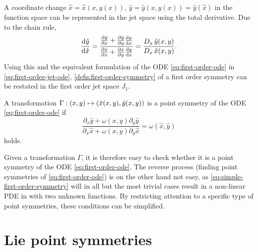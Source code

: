 A coordinate change \(\hat{x} = \hat{x}(x, y(x)),\, \hat{y} = \hat{y}(x, y(x)) = \hat{y}(\hat{x})\) in the function space can be represented in the jet space using the total derivative.
Due to the chain rule,
\begin{equation}
  \dv{\hat{y}}{\hat{x}} = 
  \frac{\pdv{\hat{y}}{x} + \pdv{\hat{y}}{y} \dv{y}{x}}{\pdv{\hat{x}}{x} + \pdv{\hat{x}}{y} \dv{y}{x}} =
  \frac{D_{x}\, \hat{y}(x,y)}{D_{x}\, \hat{x}(x,y)}.
\end{equation}
Using this and the equivalent formulation of the ODE \ref{eq:first-order-ode} in \cref{eq:first-order-jet-ode}, \cref{defn:first-order-symmetry} of a first order symmetry can be restated in the first order jet space \(J_1\).
\begin{lem} \label{lem:simple-first-order-symmetry}
  A transformation \(\Gamma: \pqty{x,y} \mapsto \pqty{\hat{x}(x,y), \hat{y}(x,y)}\) is a point symmetry of the ODE \ref{eq:first-order-ode} if
  \begin{equation} \label{eq:simple-first-order-symmetry}
    \frac{\partial_x \hat{y} + \omega(x,y) \partial_y \hat{y}}{\partial_x \hat{x} + \omega(x,y) \partial_y \hat{x}} = \omega(\hat{x},\hat{y})
  \end{equation}
  holds.
\end{lem} %
Given a transformation \(\Gamma\), it is therefore easy to check whether it is a point symmetry of the ODE \ref{eq:first-order-ode}.
The reverse process (finding point symmetries of \cref{eq:first-order-ode}) is on the other hand not easy, as \cref{eq:simple-first-order-symmetry} will in all but the most trivial cases result in a non-linear PDE in with two unknown functions.
By restricting attention to a specific type of point symmetries, these conditions can be simplified.

\section{Lie point symmetries}

